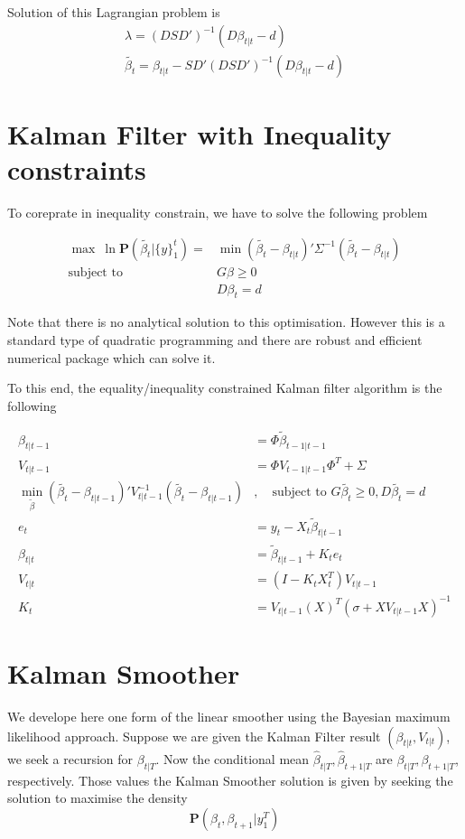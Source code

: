 \documentclass{article}
\theoremstyle{plain}
\theoremstyle{definition}
\theoremstyle{remark}
\newcommand{\PP}{\mathbf{P}}
\begin{document}
Solution of this Lagrangian problem is 
\begin{eqnarray}
\lambda = (D S D')^{-1} ( D \beta_{t|t}- d)\\
\tilde{\beta_t} = \beta_{t|t} - S D' ( D S D')^{-1} (D \beta_{t|t} - d)
\end{eqnarray}
\section{Kalman Filter with Inequality constraints}
To coreprate in inequality constrain, we have to solve the following problem 

\begin{equation}
\begin{split}
\max \: \ln \PP(\tilde{\beta_t} | \{y\}^t_1) = &\min (\tilde{\beta_t}  - \beta_{t|t})' \Sigma^{-1} (\tilde{\beta_t}  - \beta_{t|t})\\
\mbox{subject to } & G\beta \geq 0 \\ & D\beta_t = d
\end{split}
\end{equation}

Note that there is no analytical solution to this optimisation. However this is a standard type of quadratic programming and there are robust and efficient numerical package which can solve it.

To this end, the equality/inequality constrained Kalman filter algorithm is the following

\begin{equation}
\begin{split}
\beta_{t|t-1} &=\Phi \tilde{ \beta}_{t-1|t-1}\\
V_{t|t-1} &= \Phi V_{t-1|t-1}\Phi^T  + \Sigma \\
\min_{\tilde{\beta}} (\tilde{\beta_t}  - \beta_{t|t-1})' V_{t|t-1}^{-1} (\tilde{\beta_t}  - \beta_{t|t-1})&, \quad \mbox{subject to } G\tilde{\beta_t} \geq 0 ,D \tilde{\beta_t} = d\\
e_t &= y_t -  X_t\tilde{ \beta}_{t|t-1} \\
\beta_{t|t} &= \tilde{\beta}_{t|t-1} + K_t e_t\\
V_{t|t} &= (I - K_t X_t^T) V_{t|t-1}\\
K_t &=  V_{t|t-1} (X)^T (\sigma + X V_{t|t-1} X )^{-1}
\end{split}
\end{equation}


\section{Kalman Smoother}
We develope here one form of the linear smoother using the Bayesian maximum likelihood approach. 
Suppose we are given the Kalman Filter result $(\beta_{t|t}, V_{t|t})$, we seek a recursion for $\beta_{t|T}$. Now the conditional mean $\hat{\beta}_{t|T}, \hat{\beta}_{t+1|T}$ are $\beta_{t|T}, \beta_{t+1|T}$, respectively. Those values the Kalman Smoother solution is given by seeking the solution to maximise the density
\[
\PP( \beta_t, \beta_{t+1} | y_1^T)
\]
\end{document}
